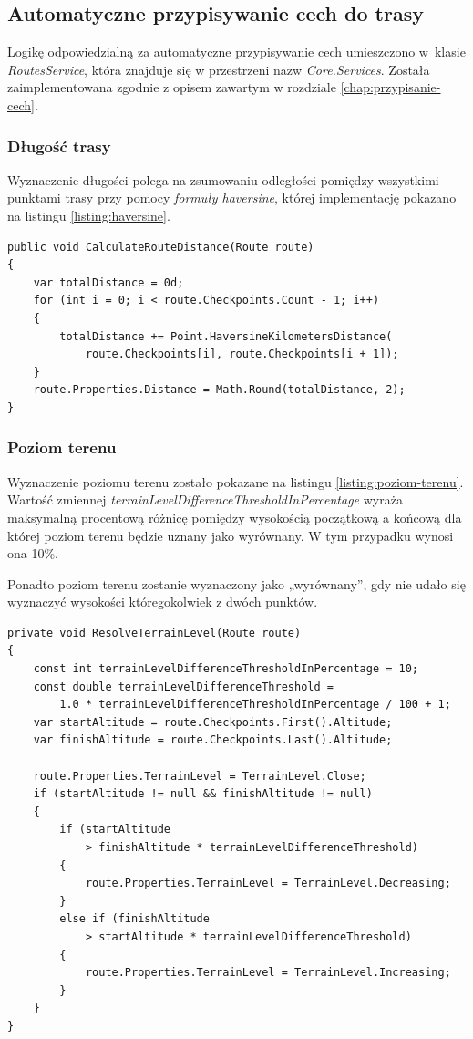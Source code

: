 \subsection{Automatyczne przypisywanie cech do trasy}
Logikę odpowiedzialną za automatyczne przypisywanie cech umieszczono w~klasie \textit{RoutesService}, która znajduje się w przestrzeni nazw \textit{Core.Services}. Została zaimplementowana zgodnie z opisem zawartym w rozdziale \ref{chap:przypisanie-cech}.
\subsubsection{Długość trasy}
Wyznaczenie długości polega na zsumowaniu odległości pomiędzy wszystkimi punktami trasy przy pomocy \textit{formuły haversine}, której implementację pokazano na listingu \ref{listing:haversine}.
\begin{lstlisting}[caption={Wyznaczenie długości trasy},label=listing:dlugosc-trasy]
public void CalculateRouteDistance(Route route)
{
    var totalDistance = 0d;
    for (int i = 0; i < route.Checkpoints.Count - 1; i++)
    {
        totalDistance += Point.HaversineKilometersDistance(
        	route.Checkpoints[i], route.Checkpoints[i + 1]);
    }
    route.Properties.Distance = Math.Round(totalDistance, 2);
}
\end{lstlisting}
\subsubsection{Poziom terenu}
Wyznaczenie poziomu terenu zostało pokazane na listingu \ref{listing:poziom-terenu}. Wartość zmiennej \textit{terrainLevelDifferenceThresholdInPercentage} wyraża maksymalną procentową różnicę pomiędzy wysokością początkową a końcową dla której poziom terenu będzie uznany jako wyrównany. W tym przypadku wynosi ona 10\%.

Ponadto poziom terenu zostanie wyznaczony jako „wyrównany”, gdy nie udało się wyznaczyć wysokości któregokolwiek z dwóch punktów.\\
\begin{lstlisting}[caption={Wyznaczenie poziomu terenu},label=listing:poziom-terenu]
private void ResolveTerrainLevel(Route route)
{
    const int terrainLevelDifferenceThresholdInPercentage = 10;
    const double terrainLevelDifferenceThreshold =
    	1.0 * terrainLevelDifferenceThresholdInPercentage / 100 + 1;
    var startAltitude = route.Checkpoints.First().Altitude;
    var finishAltitude = route.Checkpoints.Last().Altitude;

    route.Properties.TerrainLevel = TerrainLevel.Close;
    if (startAltitude != null && finishAltitude != null)
    {
        if (startAltitude 
        	> finishAltitude * terrainLevelDifferenceThreshold)
        {
            route.Properties.TerrainLevel = TerrainLevel.Decreasing;
        }
        else if (finishAltitude 
        	> startAltitude * terrainLevelDifferenceThreshold)
        {
            route.Properties.TerrainLevel = TerrainLevel.Increasing;
        }
    }
}
\end{lstlisting}
